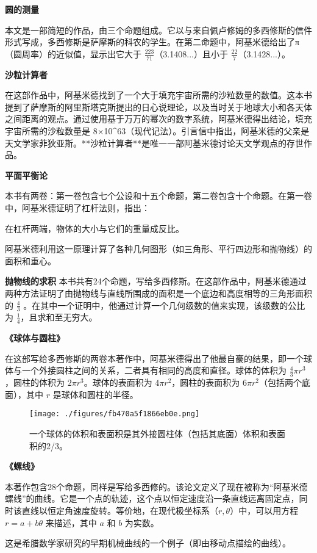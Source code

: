 \textbf{圆的测量}

本文是一部简短的作品，由三个命题组成。它以与来自佩卢修姆的多西修斯的信件形式写成，多西修斯是萨摩斯的科农的学生。在第二命题中，阿基米德给出了π（圆周率）的近似值，显示出它大于 \( \frac{223}{71} \)（3.1408...）且小于 \( \frac{22}{7} \)（3.1428...）。

\textbf{沙粒计算者}

在这部作品中，阿基米德找到了一个大于填充宇宙所需的沙粒数量的数值。这本书提到了萨摩斯的阿里斯塔克斯提出的日心说理论，以及当时关于地球大小和各天体之间距离的观点。通过使用基于万万的幂次的数字系统，阿基米德得出结论，填充宇宙所需的沙粒数量是 8×10^63（现代记法）。引言信中指出，阿基米德的父亲是天文学家菲狄亚斯。**沙粒计算者**是唯一一部阿基米德讨论天文学观点的存世作品。

\textbf{平面平衡论}

本书有两卷：第一卷包含七个公设和十五个命题，第二卷包含十个命题。在第一卷中，阿基米德证明了杠杆法则，指出：

在杠杆两端，物体的大小与它们的重量成反比。

阿基米德利用这一原理计算了各种几何图形（如三角形、平行四边形和抛物线）的面积和重心。

\textbf{抛物线的求积}
本书共有24个命题，写给多西修斯。在这部作品中，阿基米德通过两种方法证明了由抛物线与直线所围成的面积是一个底边和高度相等的三角形面积的 \( \frac{4}{3} \) 。在其中一个证明中，他通过计算一个几何级数的值来实现，该级数的公比为 \( \frac{1}{4} \)，且求和至无穷大。

\textbf{《球体与圆柱》}

在这部写给多西修斯的两卷本著作中，阿基米德得出了他最自豪的结果，即一个球体与一个外接圆柱之间的关系，二者具有相同的高度和直径。球体的体积为 \( \frac{4}{3} \pi r^3 \)，圆柱的体积为 \( 2 \pi r^3 \)。球体的表面积为 \( 4 \pi r^2 \)，圆柱的表面积为 \( 6 \pi r^2 \)（包括两个底面），其中 \( r \) 是球体和圆柱的半径。
\begin{figure}[ht]
\centering
\texttt{[image: ./figures/fb470a5f1866eb0e.png]}
\caption{一个球体的体积和表面积是其外接圆柱体（包括其底面）体积和表面积的2/3。} \label{fig_Archim_8}
\end{figure}
\textbf{《螺线》}

本著作包含28个命题，同样是写给多西修的。该论文定义了现在被称为“阿基米德螺线”的曲线。它是一个点的轨迹，这个点以恒定速度沿一条直线远离固定点，同时该直线以恒定角速度旋转。等价地，在现代极坐标系（\(r,\theta\)）中，可以用方程 \( r = a + b\theta \) 来描述，其中 \(a\) 和 \(b\) 为实数。

这是希腊数学家研究的早期机械曲线的一个例子（即由移动点描绘的曲线）。


